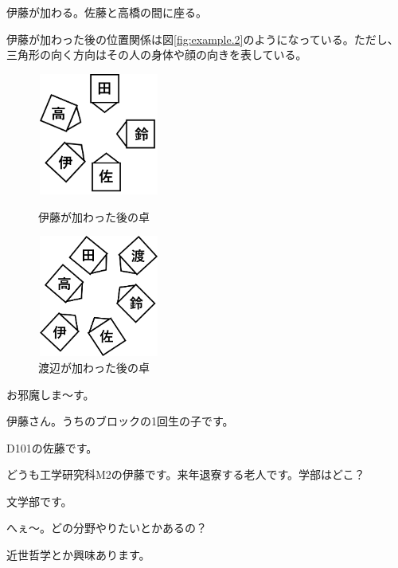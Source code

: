 \begin{multicols}{2}
伊藤が加わる。佐藤と高橋の間に座る。
\par
伊藤が加わった後の位置関係は図\ref{fig:example.2}のようになっている。ただし、三角形の向く方向はその人の身体や顔の向きを表している。
\begin{figure}[htbp]
\begin{minipage}[b]{0.45\linewidth}
   \centering
  \includegraphics[height=4cm,width=4cm]{2025shinki/konpa_furumai/figures/taku.example_2.png}
  \caption{伊藤が加わった後の卓}
  \label{fig:example.2}
\end{minipage}
\begin{minipage}[b]{0.45\linewidth}
  \centering
  \includegraphics[height=4cm,width=4cm]{2025shinki/konpa_furumai/figures/taku.example_3.png}
  \caption{渡辺が加わった後の卓}
  \label{fig:example.3}
\end{minipage}
\end{figure}
\par
{}
お邪魔しま～す。

伊藤さん。うちのブロックの1回生の子です。

D101の佐藤です。

どうも工学研究科M2の伊藤です。来年退寮する老人です。学部はどこ？

文学部です。

へぇ～。どの分野やりたいとかあるの？

近世哲学とか興味あります。


\end{multicols}
